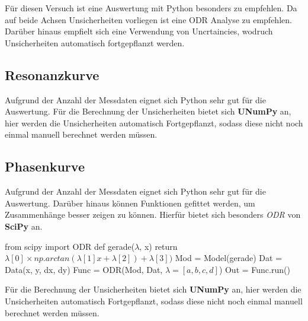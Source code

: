 \documentclass[a4paper,12pt]{article}
\begin{document}
\begin{center}
\begin{tcolorbox}[colback=gray!20, colframe=red, width=0.8\textwidth, boxrule=1pt, arc=1mm]
Für diesen Versuch ist eine Auswertung mit Python besonders zu empfehlen. \newline
Da auf beide Achsen Unsicherheiten vorliegen ist eine ODR Analyse zu empfehlen. Darüber hinaus empfielt sich eine Verwendung von Uncrtaincies, wodruch Unsicherheiten automatisch fortgepflanzt werden.
\end{tcolorbox}
\end{center}

\subsection{Resonanzkurve}
Aufgrund der Anzahl der Messdaten eignet sich Python sehr gut für die Auswertung.  \newline
Für die Berechnung der Unsicherheiten bietet sich \textbf{UNumPy} an, hier werden die Unsicherheiten automatisch Fortgepflanzt, sodass diese nicht noch einmal manuell berechnet werden müssen.

\subsection{Phasenkurve}
Aufgrund der Anzahl der Messdaten eignet sich Python sehr gut für die Auswertung. Darüber hinaus können Funktionen gefittet werden, um Zusammenhänge besser zeigen zu können. Hierfür bietet sich besonders \textit{ODR} von \textbf{SciPy} an.
\begin{center}
\begin{tcolorbox}[colback=gray!20, colframe=black, width=1\textwidth, boxrule=1pt, arc=1mm]
from scipy import ODR \newline
def gerade($\lambda$, x) \newline
\hspace*{1cm} return $\lambda[0] \times np.arctan(\lambda[1]x + \lambda[2])+\lambda[3])$ \newline
Mod = Model(gerade) \newline
Dat = Data(x, y, dx, dy) \newline
Func = ODR(Mod, Dat, $\lambda=[a, b, c, d]$) \newline
Out = Func.run()
\end{tcolorbox}
\end{center}
Für die Berechnung der Unsicherheiten bietet sich \textbf{UNumPy} an, hier werden die Unsicherheiten automatisch Fortgepflanzt, sodass diese nicht noch einmal manuell berechnet werden müssen. \newline
\end{document}
